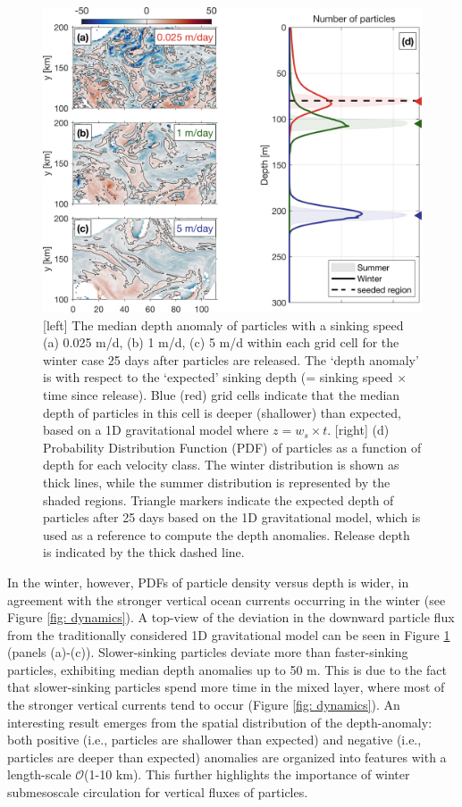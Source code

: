 \documentclass[article,linenumbers]{agujournal2018}
\begin{document}
	\begin{figure}[ht!]
		\centering
		\includegraphics[width = .8\linewidth]{Fig6.png}
		\caption{[left] 
			The median depth anomaly of particles with a sinking speed (a) 0.025 m/d, (b) 1 m/d, (c) 5 m/d within each grid cell for the winter case 25 days after particles are released. The `depth anomaly' is with respect to the `expected' sinking depth (= sinking speed $\times$ time since release). Blue (red) grid cells indicate that the median depth of particles in this cell is deeper (shallower) than expected, based on a 1D gravitational model where $z = w_s\times t$. [right] (d) Probability Distribution Function (PDF) of particles as a function of depth for each velocity class. The winter distribution is shown as thick lines, while the summer distribution is represented by the shaded regions. Triangle markers indicate the expected depth of particles after 25 days based on the 1D gravitational model, which is used as a reference to compute the depth anomalies. Release depth is indicated by the thick dashed line.}	
		\label{fig: particle_depth_distribution}
	\end{figure}
	
	In the winter, however, PDFs of particle density versus depth is wider, in agreement with the stronger vertical ocean currents occurring in the winter (see Figure \ref{fig: dynamics}). A top-view of the deviation in the downward particle flux from the traditionally considered 1D gravitational model can be seen in Figure \ref{fig: particle_depth_distribution} (panels (a)-(c)). Slower-sinking particles deviate more than faster-sinking particles, exhibiting median depth anomalies up to 50 m. This is due to the fact that slower-sinking particles spend more time in the mixed layer, where most of the stronger vertical currents tend to occur (Figure \ref{fig: dynamics}). An interesting result emerges from the spatial distribution of the depth-anomaly: both positive (i.e., particles are shallower than expected) and negative (i.e., particles are deeper than expected) anomalies are organized into features with a length-scale $\mathcal{O}$(1-10 km). This further highlights the importance of winter submesoscale circulation for vertical fluxes of particles.
	
\end{document}
